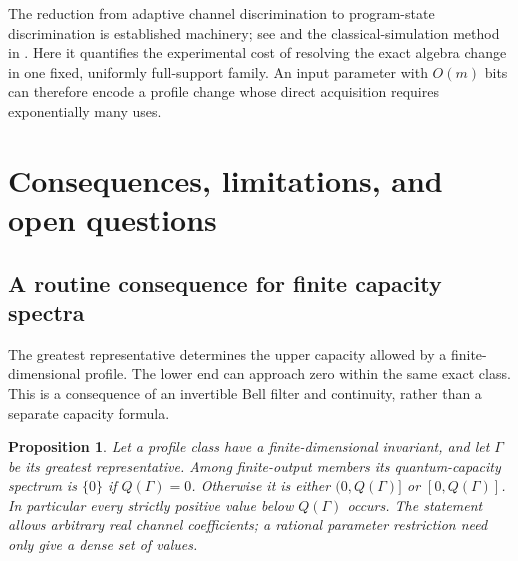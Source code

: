 \documentclass[11pt,reqno]{amsart}
\newtheorem{proposition}[theorem]{Proposition}
\theoremstyle{definition}
\theoremstyle{remark}
\numberwithin{equation}{section}
\begin{document}
The reduction from adaptive channel discrimination to program-state discrimination is established machinery; see \cite[Theorem~3]{JiEtAl} and the classical-simulation method in \cite{Demkowicz}. Here it quantifies the experimental cost of resolving the exact algebra change in one fixed, uniformly full-support family. An input parameter with $O(m)$ bits can therefore encode a profile change whose direct acquisition requires exponentially many uses.



\section{Consequences, limitations, and open questions}\label{sec:discussion}

\subsection{A routine consequence for finite capacity spectra}

The greatest representative determines the upper capacity allowed by a finite-dimensional profile. The lower end can approach zero within the same exact class. This is a consequence of an invertible Bell filter and continuity, rather than a separate capacity formula.

\begin{proposition}\label{prop:capacity-spectrum}
Let a profile class have a finite-dimensional invariant, and let $\Gamma$ be its greatest representative. Among finite-output members its quantum-capacity spectrum is $\{0\}$ if $Q(\Gamma)=0$. Otherwise it is either $(0,Q(\Gamma)]$ or $[0,Q(\Gamma)]$. In particular every strictly positive value below $Q(\Gamma)$ occurs. The statement allows arbitrary real channel coefficients; a rational parameter restriction need only give a dense set of values.
\end{proposition}
\end{document}
